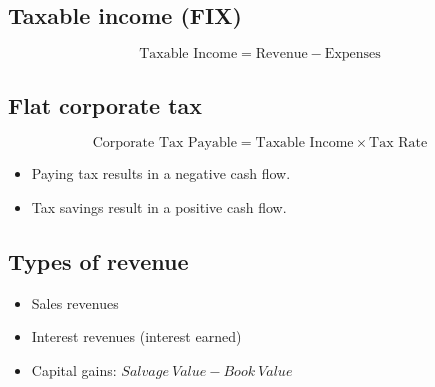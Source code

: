 \subsection{Taxable income (FIX)}
\begin{definition}
    \begin{equation}
        \text{Taxable Income} = \text{Revenue} - \text{Expenses}
    \end{equation}
\end{definition}

\subsection{Flat corporate tax}
\begin{definition}
    \begin{equation}
        \text{Corporate Tax Payable} = \text{Taxable Income} \times \text{Tax Rate}
    \end{equation}

    \begin{itemize}
        \item Paying tax results in a negative cash flow.
        \item Tax savings result in a positive cash flow.
    \end{itemize}    
\end{definition}

\subsection{Types of revenue}
\begin{terminology}
    \begin{itemize}
        \item Sales revenues
        \item Interest revenues (interest earned)
        \item Capital gains: $Salvage \: Value - Book \: Value$
    \end{itemize}
\end{terminology}

